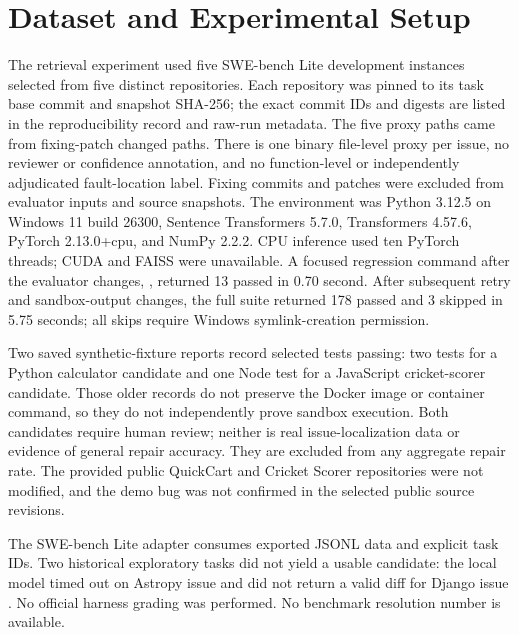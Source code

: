 \documentclass[3p,times,procedia]{elsarticle}
\begin{document}
\section{Dataset and Experimental Setup}
The retrieval experiment used five SWE-bench Lite development instances selected from five distinct repositories. Each repository was pinned to its task base commit and snapshot SHA-256; the exact commit IDs and digests are listed in the reproducibility record and raw-run metadata. The five proxy paths came from fixing-patch changed paths. There is one binary file-level proxy per issue, no reviewer or confidence annotation, and no function-level or independently adjudicated fault-location label. Fixing commits and patches were excluded from evaluator inputs and source snapshots. The environment was Python 3.12.5 on Windows 11 build 26300, Sentence Transformers 5.7.0, Transformers 4.57.6, PyTorch 2.13.0+cpu, and NumPy 2.2.2. CPU inference used ten PyTorch threads; CUDA and FAISS were unavailable. A focused regression command after the evaluator changes, \texttt{}, returned 13 passed in 0.70 second. After subsequent retry and sandbox-output changes, the full suite returned 178 passed and 3 skipped in 5.75 seconds; all skips require Windows symlink-creation permission.

Two saved synthetic-fixture reports record selected tests passing: two tests for a Python calculator candidate and one Node test for a JavaScript cricket-scorer candidate. Those older records do not preserve the Docker image or container command, so they do not independently prove sandbox execution. Both candidates require human review; neither is real issue-localization data or evidence of general repair accuracy. They are excluded from any aggregate repair rate. The provided public QuickCart and Cricket Scorer repositories were not modified, and the demo bug was not confirmed in the selected public source revisions.

The SWE-bench Lite adapter consumes exported JSONL data and explicit task IDs. Two historical exploratory tasks did not yield a usable candidate: the local model timed out on Astropy issue \texttt{} and did not return a valid diff for Django issue \texttt{}. No official harness grading was performed. No benchmark resolution number is available.
\end{document}
